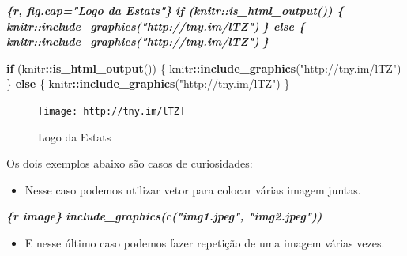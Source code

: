 \documentclass[
]{book}
\newenvironment{Shaded}{\begin{snugshade}}{\end{snugshade}}
\newcommand{\ControlFlowTok}[1]{\textcolor[rgb]{0.13,0.29,0.53}{\textbf{#1}}}
\newcommand{\InformationTok}[1]{\textcolor[rgb]{0.56,0.35,0.01}{\textbf{\textit{#1}}}}
\newcommand{\KeywordTok}[1]{\textcolor[rgb]{0.13,0.29,0.53}{\textbf{#1}}}
\newcommand{\NormalTok}[1]{#1}
\newcommand{\OperatorTok}[1]{\textcolor[rgb]{0.81,0.36,0.00}{\textbf{#1}}}
\newcommand{\StringTok}[1]{\textcolor[rgb]{0.31,0.60,0.02}{#1}}
\providecommand{\tightlist}{%
  \setlength{\itemsep}{0pt}\setlength{\parskip}{0pt}}
\begin{document}
\begin{Shaded}
\begin{Highlighting}[]
\InformationTok{\textasciigrave{}\textasciigrave{}\textasciigrave{}\{r, fig.cap="Logo da Estats"\}}
\InformationTok{if (knitr::is\_html\_output()) \{}
\InformationTok{    knitr::include\_graphics("http://tny.im/lTZ")}
\InformationTok{\} else \{}
\InformationTok{    knitr::include\_graphics("http://tny.im/lTZ")}
\InformationTok{\}}
\InformationTok{\textasciigrave{}\textasciigrave{}\textasciigrave{}}
\end{Highlighting}
\end{Shaded}

\begin{Shaded}
\begin{Highlighting}[]
\ControlFlowTok{if}\NormalTok{ (knitr}\OperatorTok{::}\KeywordTok{is\_html\_output}\NormalTok{()) \{}
\NormalTok{    knitr}\OperatorTok{::}\KeywordTok{include\_graphics}\NormalTok{(}\StringTok{"http://tny.im/lTZ"}\NormalTok{)}
\NormalTok{\} }\ControlFlowTok{else}\NormalTok{ \{}
\NormalTok{    knitr}\OperatorTok{::}\KeywordTok{include\_graphics}\NormalTok{(}\StringTok{"http://tny.im/lTZ"}\NormalTok{)}
\NormalTok{\}}
\end{Highlighting}
\end{Shaded}

\begin{figure}

{\centering \texttt{[image: http://tny.im/lTZ]} 

}

\caption{Logo da Estats}\label{fig:unnamed-chunk-3}
\end{figure}

Os dois exemplos abaixo são casos de curiosidades:

\begin{itemize}
\tightlist
\item
  Nesse caso podemos utilizar vetor para colocar várias imagem juntas.
\end{itemize}

\begin{Shaded}
\begin{Highlighting}[]
\InformationTok{\textasciigrave{}\textasciigrave{}\textasciigrave{}\{r image\}}
\InformationTok{include\_graphics(c("img1.jpeg", "img2.jpeg"))}
\InformationTok{\textasciigrave{}\textasciigrave{}\textasciigrave{}}
\end{Highlighting}
\end{Shaded}

\begin{itemize}
\tightlist
\item
  E nesse último caso podemos fazer repetição de uma imagem várias vezes.
\end{itemize}
\end{document}
